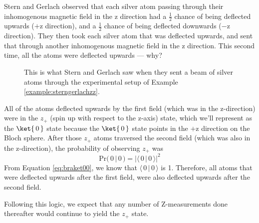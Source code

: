 \documentclass{article}
\theoremstyle{definition}
\newcommand{\abs}[1]{{\big\vert} #1 {\big\vert}}
\newcommand{\kz}[1]{\ket{\,#1\,}}
\begin{document}
\begin{example} \label{example:sterngerlachzz}
Stern and Gerlach observed that each silver atom passing through their inhomogenous magnetic field in the z direction had a $\frac{1}{2}$ chance of being deflected upwards ($+$z direction), and a $\frac{1}{2}$ chance of being deflected downwards ($-$z direction).  They then took each silver atom that was deflected upwards, and sent that through another inhomogenous magnetic field in the z direction.  This second time, all the atoms were deflected upwards --- why?

\begin{figure}[H]
	\caption{This is what Stern and Gerlach saw when they sent a beam of silver atoms through the experimental setup of Example \ref{example:sterngerlachzz}.}
\end{figure}

\textnormal{All of the atoms deflected upwards by the first field (which was in the z-direction) were in the $z_+$ (spin up with respect to the z-axis) state, which we'll represent as the $\kz0$ state because the $\kz0$ state points in the $+$z direction on the Bloch sphere.  After those $z_+$ atoms traversed the second field (which was also in the z-direction), the probability of observing $z_+$ was
\begin{equation}
	\label{eq:prob00}
	\text{Pr}(\,0\,|\,0\,) = \abs{\langle\,0\,|\,0\,\rangle}^2
\end{equation}
From Equation \ref{eq:braket00}, we know that $\langle\,0\,|\,0\,\rangle$ is 1.  Therefore, all atoms that were deflected upwards after the first field, were also deflected upwards after the second field.}

\textnormal{Following this logic, we expect that any number of Z-measurements done thereafter would continue to yield the $z_+$ state.}
\end{example}
\end{document}
